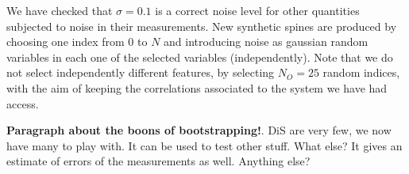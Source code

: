 \documentclass[10pt,letterpaper]{article}
\begin{document}
We have checked that $\sigma=0.1$ is a correct noise level for other quantities subjected to noise in their measurements. New synthetic spines are produced by choosing one index from 0 to $N$ and introducing noise as gaussian random variables in each one of the selected variables (independently). Note that we do not select independently different features, by selecting $N_O=25$ random indices, with the aim of keeping the correlations associated to the system we have had access.

{\bf Paragraph about the boons of bootstrapping!}. DiS are very few, we now have many to play with. It can be used to test other stuff. What else? It gives an estimate of errors of the measurements as well. Anything else?


\begin{thebibliography}{10}


\end{thebibliography}
\end{document}
